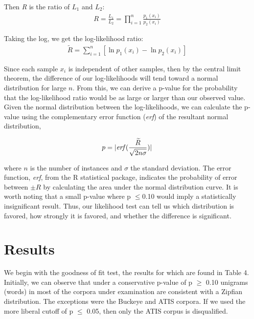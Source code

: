 \documentclass[12pt]{article}
\begin{document}
Then \emph{R} is the ratio of $L_{1}$ and $L_{2}$:
\begin{align*}
R = \frac{L_{1}}{L_{2}} = \prod_{i=1}^{n}\frac{p_{1}(x_i)}{p_{2}(x_i)}
\end{align*}

Taking the log, we get the log-likelihood ratio:
\begin{align*}
\widetilde{R} = \sum_{i=1}^{n}\left[\ln p_{1}(x_i)-\ln p_{2}(x_i)\right]
\end{align*}

Since each sample $x_{i}$ is independent of other samples, then by the central limit theorem, the difference of our log-likelihoods will tend toward a normal distribution for large $n$.  From this, we can derive a p-value for the probability that the log-likelihood ratio would be as large or larger than our observed value. Given the normal distribution between the log-likelihoods, we can calculate the p-value using the complementary error function (\emph{erf}) of the resultant normal distribution, 

\begin{align*}
p = |\textrm{\emph{erf}}(\frac{\widetilde{R}}{\sqrt{2n\sigma}})|
\end{align*}

\noindent where $n$ is the number of instances and $\sigma$ the standard deviation.  The error function, \emph{erf}, from the R statistical package, indicates the probability of error between $\pm{R}$ by calculating the area under the normal distribution curve.   It is worth noting that a small p-value where p $\leq$0.10 would imply a statistically insignificant result. Thus, our likelihood test can tell us which distribution is favored, how strongly it is favored, and whether the difference is significant.

\section{Results}

We begin with the goodness of fit test, the results for which are found in Table 4.  Initially, we can observe that under a conservative p-value of p $\geq$ 0.10 unigrams (words) in most of the corpora under examination are consistent with a Zipfian distribution. The exceptions were the Buckeye and ATIS corpora. If we used the more liberal cutoff of p $\leq$ 0.05, then only the ATIS corpus is disqualified.
\end{document}
